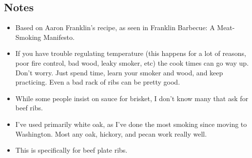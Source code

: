 \begin{multicols}{2}
\subsection*{Notes}
\begin{itemize}
    \item Based on Aaron Franklin's recipe, as seen in Franklin Barbecue: A Meat-Smoking Manifesto.
    \item If you have trouble regulating temperature (this happens for a lot of reasons, poor fire control, bad wood, leaky smoker, etc) the cook times can go way up. Don't worry. Just spend time, learn your smoker and wood, and keep practicing. Even a bad rack of ribs can be pretty good.
    \item While some people insist on sauce for brisket, I don't know many that ask for beef ribs.
    \item I've used primarily white oak, as I've done the most smoking since moving to Washington. Most any oak, hickory, and pecan work really well.
    \item This is specifically for beef plate ribs.
\end{itemize}
\end{multicols}
\clearpage
